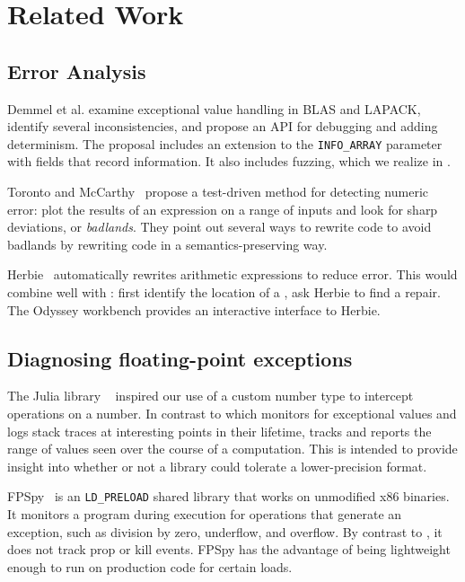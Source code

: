 \documentclass{juliacon}
\begin{document}
\section{Related Work}
\label{s:related}

\subsection{Error Analysis}

Demmel et al.\cite{ddghlllprr-correctness-2022} examine \fp{} exceptional value handling in BLAS and LAPACK, identify several inconsistencies, and propose an API for debugging and adding determinism.
The proposal includes an extension to the \texttt{INFO\_ARRAY} parameter with fields that record \genpropkill{} information.
It also includes fuzzing, which we realize in \TF{}.

Toronto and McCarthy~\cite{torontoPracticallyAccurateFloatingPoint2014} propose a test-driven method for detecting numeric error: plot the results of an expression on a range of inputs and look for sharp deviations, or \emph{badlands}.
They point out several ways to rewrite code to avoid badlands by rewriting code in a semantics-preserving way.

Herbie~\cite{panchekhaAutomaticallyImprovingAccuracy2015} automatically rewrites arithmetic expressions to reduce \fp{} error.
This would combine well with \TF{}: first identify the location of a \NaN{}, ask Herbie to find a repair.
The Odyssey\cite{misbackOdysseyInteractiveWorkbench2023} workbench provides an interactive interface to Herbie.


\subsection{Diagnosing floating-point exceptions}

The Julia library \Sherlogs{}~\cite{kMilanklSherlogsJl2021} inspired our use of a custom number type to intercept operations on a number.
In contrast to \TF{} which monitors for exceptional values and logs stack traces at interesting points in their lifetime, \Sherlogs{} tracks and reports the range of values seen over the course of a computation.
This is intended to provide insight into whether or not a library could tolerate a lower-precision \fp{} format.

FPSpy~\cite{dindaSpyingFloatingPoint2020} is an \texttt{LD\_PRELOAD} shared library that works on unmodified x86 binaries.
It monitors a program during execution for operations that generate an exception, such as division by zero, underflow, and overflow.
By contrast to \TF{}, it does not track prop or kill events.
FPSpy has the advantage of being lightweight enough to run on production code for certain loads.
\end{document}
